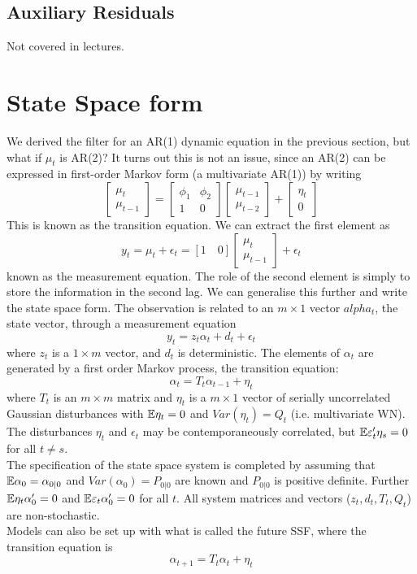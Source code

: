 \documentclass[DIV=14,titlepage=false]{scrreprt}
\begin{document}
\subsection{Auxiliary Residuals}
Not covered in lectures.
\section{State Space form}
We derived the filter for an AR(1) dynamic equation in the previous section, but what if $\mu_t$ is AR(2)? It turns out this is not an issue, since an AR(2) can be expressed in first-order Markov form (a multivariate AR(1)) by writing
\[
    \begin{bmatrix}
        \mu_t \\ \mu_{t-1}
    \end{bmatrix} =
    \begin{bmatrix}
        \phi_1 & \phi_2 \\ 1 & 0
    \end{bmatrix}
    \begin{bmatrix}
        \mu_{t-1} \\ \mu_{t-2}
    \end{bmatrix} +
    \begin{bmatrix}
        \eta_t \\ 0
    \end{bmatrix}
\]
This is known as the transition equation. We can extract the first element as
\[
    y_t = \mu_t + \epsilon_t = [1 \quad 0] \begin{bmatrix} \mu_t \\ \mu_{t-1} \end{bmatrix} + \epsilon_t
\]
known as the measurement equation. The role of the second element is simply to store the information in the second lag. We can generalise this further and write the state space form. The observation is related to an $m \times 1$ vector $alpha_t$, the state vector, through a measurement equation
\[
    y_t = z_t \alpha_t + d_t + \epsilon_t
\]
where $z_t$ is a $1 \times m$ vector, and $d_t$ is deterministic. The elements of $\alpha_t$ are generated by a first order Markov process, the transition equation:
\[
    \alpha_t = T_t \alpha_{t-1} + \eta_t
\]
where $T_t$ is an $m \times m$ matrix and $\eta_t$ is a $m \times 1$ vector of serially uncorrelated Gaussian disturbances with $\mathbb{E} \eta_t = 0$ and $Var(\eta_t) = Q_t$ (i.e. multivariate WN). The disturbances $\eta_t$ and $\epsilon_t$ may be contemporaneously correlated, but $\mathbb{E} \varepsilon_t ' \eta_s = 0$ for all $t \not = s$.\\
The specification of the state space system is completed by assuming that $\mathbb{E} \alpha_0 = \alpha_{0|0}$ and $Var(\alpha_0) = P_{0|0}$ are known and $P_{0|0}$ is positive definite. Further $\mathbb{E} \eta_t \alpha_0' = 0$ and $\mathbb{E} \varepsilon_t \alpha_0' = 0$ for all $t$. All system matrices and vectors ($z_t, d_t, T_t, Q_t$) are non-stochastic.\\
Models can also be set up with what is called the future SSF, where the transition equation is 
\[
    \alpha_{t+1} = T_t \alpha_t + \eta_t
\]
\end{document}
